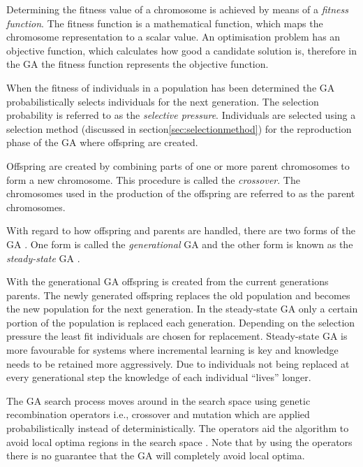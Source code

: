 Determining the fitness value of a chromosome is achieved by means of a \emph{fitness function}. The fitness function is a mathematical function, which maps the chromosome representation to a scalar value\cite{CompuIntelligenceIntro}. An optimisation problem has an objective function, which calculates how good a candidate solution is, therefore in the \gls{GA} the fitness function represents the objective function\cite{CompuIntelligenceIntro}.

When the fitness of individuals in a population has been determined the \gls{GA} probabilistically selects individuals for the next generation\cite{CompuIntelligenceIntro}. The selection probability is referred to as the \emph{selective pressure}\cite{CompuIntelligenceIntro}. Individuals are selected using a selection method (discussed in section\ref{sec:selectionmethod}) for the reproduction phase of the \gls{GA} where offspring are created\cite{CompuIntelligenceIntro}.

Offspring are created by combining parts of one or more parent chromosomes to form a new chromosome. This procedure is called the \emph{crossover}\cite{CompuIntelligenceIntro}. The chromosomes used in the production of the offspring are referred to as the parent chromosomes\cite{CompuIntelligenceIntro}.

With regard to how offspring and parents are handled, there are two forms of the \gls{GA} \cite{FamilyGA}. One form is called the \emph{generational} \gls{GA}  and the other form is known as the \emph{steady-state} \gls{GA} \cite{GeostatisticalGA,FamilyGA}.

With the generational \gls{GA} offspring is created from the current generations parents. The newly generated offspring replaces the old population and becomes the new population for the next generation\cite{FamilyGA, SpringerIntroToGAs, IntroToGAs}. In the steady-state \gls{GA} only a certain portion of the population is replaced each generation. Depending on the selection pressure the least fit individuals are chosen for replacement\cite{GeostatisticalGA,FamilyGA, SpringerIntroToGAs, IntroToGAs}. Steady-state \gls{GA} is more favourable for systems where incremental learning is key and knowledge needs to be retained more aggressively\cite{SpringerIntroToGAs, IntroToGAs}. Due to individuals not being replaced at every generational step the knowledge of each individual ``lives'' longer\cite{SpringerIntroToGAs, IntroToGAs}.

The \gls{GA} search process moves around in the search space using genetic recombination operators i.e., crossover and mutation which are applied probabilistically instead of deterministically\cite{FamilyGA}. The operators aid the algorithm to avoid local optima regions in the search space \cite{HybridIntelliGA}. Note that by using the operators there is no guarantee that the \gls{GA} will completely avoid local optima\cite{CompuIntelligenceIntro}.

